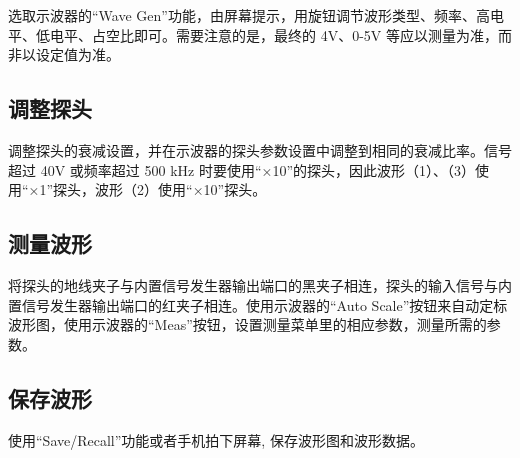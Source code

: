 \documentclass[a4paper]{article}
\begin{document}
选取示波器的“Wave Gen”功能，由屏幕提示，用旋钮调节波形类型、频率、高电平、低电平、占空比即可。需要注意的是，最终的 4V、0-5V 等应以测量为准，而非以设定值为准。

\subsection{调整探头}

调整探头的衰减设置，并在示波器的探头参数设置中调整到相同的衰减比率。信号超过 40V 或频率超过 500 kHz 时要使用“×10”的探头，因此波形（1）、（3）使用“×1”探头，波形（2）使用“×10”探头。

\subsection{测量波形}

将探头的地线夹子与内置信号发生器输出端口的黑夹子相连，探头的输入信号与内置信号发生器输出端口的红夹子相连。使用示波器的“Auto Scale”按钮来自动定标波形图，使用示波器的“Meas”按钮，设置测量菜单里的相应参数，测量所需的参数。

\subsection{保存波形}

使用“Save/Recall”功能或者手机拍下屏幕, 保存波形图和波形数据。
\end{document}
